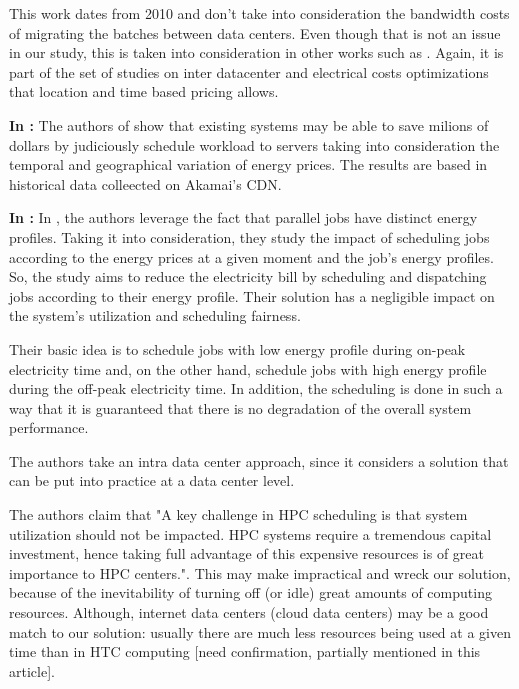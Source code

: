 This work dates from 2010 and don't take into consideration the bandwidth costs
of migrating the batches between data centers. Even though that is not an issue
in our study, this is taken into consideration in other works such as
\cite{MIGRATION_CLOUD}. Again, it is part of the set of studies on inter
datacenter and electrical costs optimizations that location and time based 
pricing allows.



\textbf{In \cite{CUTTING_BILL}:}
The authors of \cite{CUTTING_BILL} show that existing systems may be able to
save milions of dollars by judiciously schedule workload to servers taking into
consideration the temporal and geographical variation of energy prices. The
results are based in historical data colleected on Akamai's CDN. 


\textbf{In \cite{DYN_PRICING_HPC}:}
In \cite{DYN_PRICING_HPC}, the authors leverage the fact that parallel jobs have 
distinct energy profiles. Taking it into consideration, they study the impact of
scheduling jobs according to the energy prices at a given moment and the job's
energy profiles. So, the study aims to reduce the electricity bill by scheduling and
dispatching jobs according to their energy profile. Their solution has a
negligible impact on the system's utilization and scheduling fairness. 

Their basic idea is to schedule jobs with low energy profile during on-peak
electricity time and, on the other hand, schedule jobs with high energy profile
during the off-peak electricity time. In addition, the scheduling is done in
such a way that it is guaranteed that there is no degradation of the overall
system performance. 

The authors take an intra data center approach, since it considers a solution
that can be put into practice at a data center level.

The authors claim that "A key challenge in HPC scheduling is that system 
utilization should not be impacted. HPC systems require a tremendous capital 
investment, hence taking full advantage of this expensive resources is of great 
importance to HPC centers.". This may make impractical and wreck our solution,
because of the inevitability of turning off (or idle) great amounts of computing 
resources. Although, internet data centers (cloud data centers)  may be a good 
match to our solution: usually there are much less resources being used at a given 
time than in HTC computing [need confirmation, partially mentioned in this article].


